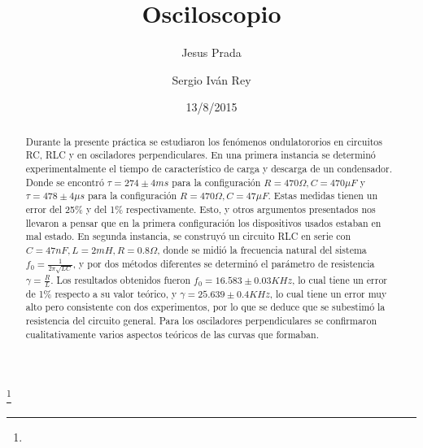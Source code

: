 \documentclass[%
 reprint,
 amsmath,amssymb,
 aps,
]{revtex4-1}
\begin{document}

\title{Osciloscopio}%
\thanks{}%

\author{Jesus Prada}
\author{Sergio Iv\'an Rey}%
%

\date{13/8/2015}%

\begin{abstract}
Durante la presente práctica se estudiaron los fen\'omenos ondulatororios en circuitos RC, RLC y en osciladores perpendiculares. En una primera instancia se determin\'o experimentalmente el tiempo de caracter\'istico de carga y descarga de un condensador. Donde se encontró $\tau = 274 \pm 4ms$ para la configuración $ R = 470\Omega, C = 470\mu F$  y $\tau = 478 \pm4\mu s$ para la configuración $ R = 470\Omega, C = 47\mu F$. Estas medidas tienen un error del 25\%  y del 1\% respectivamente. Esto, y otros argumentos presentados nos llevaron a pensar que en la primera configuración los dispositivos usados estaban en mal estado. En segunda instancia, se construy\'o un circuito RLC en serie  con $C=47nF, L = 2mH, R= 0.8\Omega$, donde se midió la frecuencia natural del sistema $f_0 = \frac{1}{2\pi\sqrt{LC}}$, y por dos m\'etodos diferentes se determin\'o el parámetro de resistencia $\gamma = \frac{R}{L}$. Los resultados obtenidos fueron $f_0 =  16.583 \pm 0.03KHz$, lo cual tiene un error de 1\% respecto a su valor teórico, y $\gamma = 25.639 \pm 0.4 KHz $, lo cual tiene un error muy alto pero consistente con dos experimentos, por lo que se deduce que se subestimó la resistencia del circuito general. Para los osciladores perpendiculares se confirmaron cualitativamente varios aspectos teóricos de las curvas que formaban.\\
\end{abstract}


\maketitle
\end{document}
